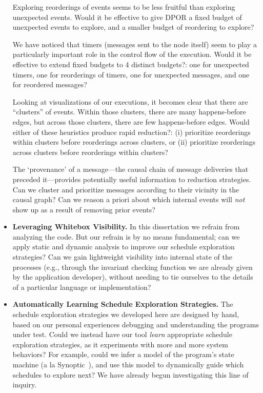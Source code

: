 \begin{itemize}
Exploring reorderings of events seems to be less fruitful than exploring
unexpected events. Would it be effective to give DPOR a fixed budget of
unexpected events to explore, and a smaller budget of reordering to explore?

We have noticed that timers (messages sent to the node itself) seem to play a
particularly important role in the control flow of the execution. Would it be
effective to extend fixed budgets to 4 distinct budgets?: one for unexpected timers,
one for reorderings of timers, one for unexpected messages, and one for
reordered messages?

Looking at visualizations of our executions, it becomes clear that there
are ``clusters'' of events. Within those clusters, there are many happens-before
edges, but across those clusters, there are few happens-before edges. Would
either of these heuristics produce rapid reduction?:
(i) prioritize reorderings within clusters before
reorderings across clusters, or (ii) prioritize reorderings across clusters
before reorderings within clusters?

The `provenance' of a message---the causal chain of message deliveries that
preceded it---provides potentially useful information to reduction strategies.
Can we cluster and prioritize messages according to their vicinity in the
causal graph? Can we reason a priori about which internal events will \textit{not} show
up as a result of removing prior events?

\item \textbf{Leveraging Whitebox Visibility.} In this dissertation we refrain
from analyzing the code. But our refrain is by no means fundamental; can we
apply static and dynamic analysis to improve our schedule exploration
strategies? Can we gain lightweight visibility into internal state of the
processes (e.g., through the invariant checking function we are already given by the
application developer), without needing to tie ourselves to the details of a particular language or
implementation?

\item \textbf{Automatically Learning Schedule Exploration Strategies.} The
schedule exploration strategies we developed here are designed by hand, based
on our personal experiences debugging and understanding the programs under
test. Could we instead have our tool
\textit{learn} appropriate schedule exploration strategies, as it experiments
with more and more system behaviors? For example, could we infer a model of
the program's state machine (a la Synoptic~\cite{synoptic,csight}), and use this model to dynamically guide which
schedules to explore next?  We have
already begun investigating this line of inquiry.


\end{itemize}
